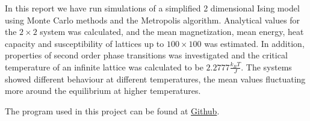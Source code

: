 

In this report we have run simulations of a simplified 2 dimensional Ising model  using Monte Carlo methods and the Metropolis algorithm.  Analytical values for the $ 2\times 2 $ system was calculated, and the mean magnetization, mean energy, heat capacity and susceptibility of lattices up to $ 100 \times 100 $ was estimated. In addition, properties of second order phase transitions was investigated and the critical temperature of an infinite lattice was calculated to be $  2.2777  \frac{k_BT}{J}   $. The systems showed different behaviour at different temperatures, the mean values fluctuating more around the equilibrium at higher temperatures. 


The program used in this project can be found at \href{https://github.com/kjetka/Project4}{Github}. 

